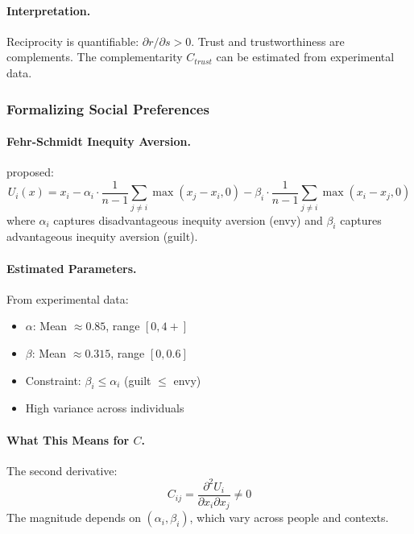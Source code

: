 \documentclass[12pt,a4paper]{article}
\begin{document}
\paragraph{Interpretation.}
Reciprocity is quantifiable: $\partial r / \partial s > 0$.
Trust and trustworthiness are complements.
The complementarity $C_{trust}$ can be estimated from experimental data.

\subsubsection{Formalizing Social Preferences}

\paragraph{Fehr-Schmidt Inequity Aversion.}
\citet{fehrschmidt} proposed:
\begin{equation}
  U_i(x) = x_i - \alpha_i \cdot \frac{1}{n-1} \sum_{j \neq i} \max(x_j - x_i, 0)
                - \beta_i \cdot \frac{1}{n-1} \sum_{j \neq i} \max(x_i - x_j, 0)
\end{equation}
where $\alpha_i$ captures disadvantageous inequity aversion (envy)
and $\beta_i$ captures advantageous inequity aversion (guilt).

\paragraph{Estimated Parameters.}
From experimental data:
\begin{itemize}
  \item $\alpha$: Mean $\approx 0.85$, range $[0, 4+]$
  \item $\beta$: Mean $\approx 0.315$, range $[0, 0.6]$
  \item Constraint: $\beta_i \leq \alpha_i$ (guilt $\leq$ envy)
  \item High variance across individuals
\end{itemize}

\paragraph{What This Means for $C$.}
The second derivative:
\begin{equation}
  C_{ij} = \frac{\partial^2 U_i}{\partial x_i \partial x_j} \neq 0
\end{equation}
The magnitude depends on $(\alpha_i, \beta_i)$, which vary across people and contexts.
\end{document}
